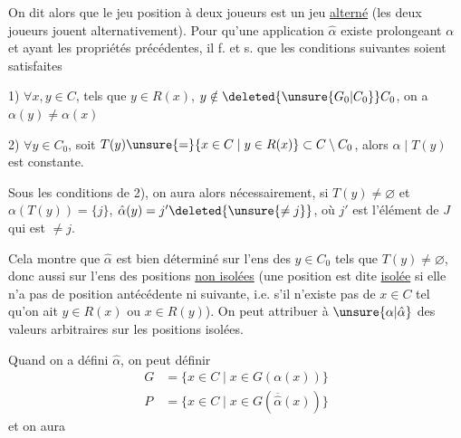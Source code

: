 On dit alors que le jeu  position à deux joueurs est un jeu \uline{alterné} (les deux joueurs jouent alternativement). Pour qu'une application $\hat\alpha$ existe prolongeant $\alpha$ et ayant les propriétés précédentes, il f. et s. que les  conditions suivantes soient satisfaites

1) $\forall x,y\in C$, tels que $y\in R(x)$, $y\notin\deleted{\unsure{G_0|C_0}} C_0$, on a $\alpha(y)\ne\alpha(x)$

2) $\forall y\in C_0$, soit $T(y)\unsure{=}\{x\in C\mid y\in R(x)\}\subset C\setminus C_0$, alors $\alpha\mid T(y)$ est constante.

Sous les conditions de 2), on aura alors nécessairement, si $T(y)\ne\varnothing$ et $\alpha(T(y))=\{j\}$, $\hat\alpha(y)=j'\deleted{\unsure{\ne j}}$, où $j'$ est l'élément de $J$ qui est $\ne j$.

Cela montre que $\hat\alpha$ est bien déterminé sur l'ens  des $y\in C_0$ tels que $T(y)\ne\varnothing$, donc aussi sur l'ens des positions \uline{non isolées} (une position  est dite \uline{isolée} si elle n'a pas de position antécédente ni suivante, i.e. s'il n'existe pas de $x\in C$ tel qu'on ait $y\in R(x)$ ou $x\in R(y)$). On peut attribuer à $\unsure{\alpha|\hat\alpha}$ des valeurs arbitraires sur les positions isolées.

Quand on a défini  $\hat\alpha$, on peut définir
\[
\begin{aligned}
G&=\{x\in C\mid x\in G(\alpha(x))\}\\
P&=\{x\in C\mid x\in G(\overline{\hat\alpha}(x))\}
\end{aligned}
\]
et on  aura
